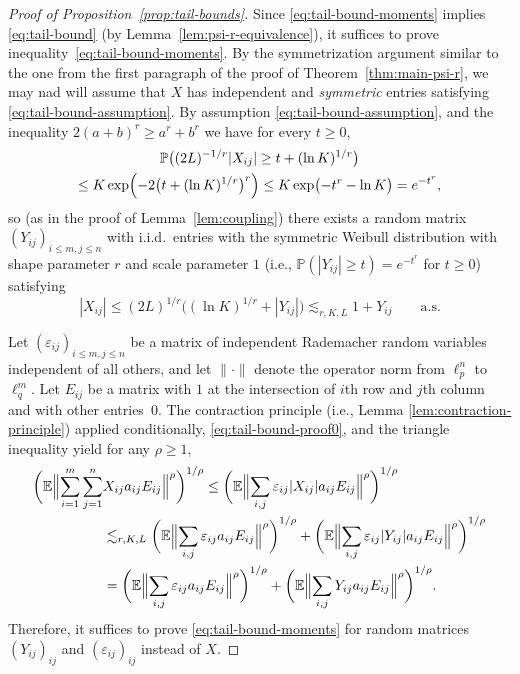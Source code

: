 \documentclass[a4paper]{amsart}
\theoremstyle{definition}
\theoremstyle{remark}
\numberwithin{equation}{section}
\newcommand*{\EE}{\mathbb{E}}
\newcommand*{\PP}{\mathbb{P}}
\begin{document}
\begin{proof}[Proof of Proposition~\ref{prop:tail-bounds}]
	Since \eqref{eq:tail-bound-moments} implies \eqref{eq:tail-bound} (by Lemma~\ref{lem:psi-r-equivalence}), it suffices to prove
	inequality~\eqref{eq:tail-bound-moments}.
	By the symmetrization argument similar to the one from the first paragraph of the proof of Theorem~\ref{thm:main-psi-r}, we may nad will assume that $X$ has independent and \textit{symmetric} entries satisfying \eqref{eq:tail-bound-assumption}.
	By assumption \eqref{eq:tail-bound-assumption}, and the inequality $2(a+b)^r\ge a^r+b^r$
we have for every $t\ge 0$,
	\begin{multline*}
		\PP\bigl((2L)^{-1/r}|X_{ij}| \ge t+ (\ln K)^{1/r}\bigr)
		\\
		\le K\exp\Bigl( -2\bigl( t+ (\ln K)^{1/r} \bigr)^r \Bigr)\le K \exp\bigl( -t^r -\ln K \bigr)
		= e^{-t^r},
	\end{multline*}
	so (as in the proof of Lemma~\ref{lem:coupling}) there exists  a random matrix  $(Y_{ij})_{i\leq m, j\leq n}$  with i.i.d.\  entries with the symmetric Weibull distribution with shape parameter $r$ and scale parameter $1$ (i.e.,  $\PP( |Y_{ij}| \ge t) = e^{-t^r}$ for $t\geq 0$)
satisfying
	\begin{equation} \label{eq:tail-bound-proof0}
		|X_{ij}| \le (2L)^{1/r} \bigl( (\ln K)^{1/r} +|Y_{ij}| \bigr) \lesssim_{r,K,L} 1+Y_{ij}	\qquad \text{a.s.}
	\end{equation}
	
	
	Let $(\varepsilon_{ij})_{i\leq m, j\leq n}$ be a matrix of independent Rademacher random variables independent of all others, and
	let $\| \cdot\|$ denote the operator norm from $\ell_{p}^n$ to $\ell_q^m$. Let $E_{ij}$ be a matrix with $1$ at the intersection of $i$th row and $j$th column and with other entries~$0$.
	The contraction principle (i.e., Lemma \ref{lem:contraction-principle}) applied  conditionally, \eqref{eq:tail-bound-proof0}, and the triangle inequality yield for any $\rho\ge 1$,
\begin{align*} 
 \biggl( \EE \Bigl\|\sum_{i=1}^m \sum_{j=1}^n & X_{ij} a_{ij}E_{ij} \Bigr\|^\rho \biggr)^{1/\rho}
\leq  \biggl( \EE \Bigl\|\sum_{i,j} \varepsilon_{ij}|X_{ij}| a_{ij}E_{ij} \Bigr\|^\rho \biggr)^{1/\rho}
\\
 &\lesssim_{r,K,L}    \biggl( \EE \Bigl\|\sum_{i,j} \varepsilon_{ij} a_{ij}E_{ij} \Bigr\|^\rho \biggr)^{1/\rho} +   \biggl( \EE \Bigl\|\sum_{i,j} \varepsilon_{ij}|Y_{ij}| a_{ij}E_{ij} \Bigr\|^\rho \biggr)^{1/\rho}
\\
& =     \biggl( \EE \Bigl\|\sum_{i,j} \varepsilon_{ij} a_{ij}E_{ij} \Bigr\|^\rho \biggr)^{1/\rho} +   \biggl( \EE \Bigl\|\sum_{i,j} Y_{ij} a_{ij}E_{ij} \Bigr\|^\rho \biggr)^{1/\rho}.
\end{align*}
Therefore, it suffices to prove \eqref{eq:tail-bound-moments} for random matrices $(Y_{ij})_{ij}$ and $(\varepsilon_{ij})_{ij}$ instead of $X$.


\end{proof}
\end{document}
